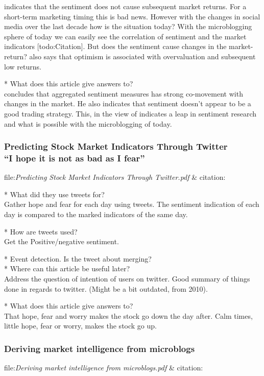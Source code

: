 \cite[p3]{Brown20041} indicates that the sentiment does not cause subsequent
market returns. For a short-term marketing timing this is bad news. However
with the changes in social media over the last decade how is the situation
today? With the microblogging sphere of today we can easily see the
correlation of sentiment and the market indicators [todo:Citation]. But
does the sentiment cause changes in the market-return? 
\cite[p3]{Brown20041} also says that optimism is associated with overvaluation and subsequent low returns.

* What does this article give answers to?\\
\cite[p]{Brown20041} concludes that aggregated sentiment measures has strong
co-movement with changes in the market. He also indicates that sentiment
doesn't appear to be a good trading strategy. This, in the view of
\cite[]{Zhang201155} indicates a leap in sentiment research and what is possible
with the microblogging of today. 

\subsubsection{Predicting Stock Market Indicators Through Twitter\\ “I hope it is not as bad as I fear”}
file:\textit{Predicting Stock Market Indicators Through Twitter.pdf} & citation:\cite[]{Zhang201155}

* What did they use tweets for?\\
Gather hope and fear for each day using tweets. 
The sentiment indication of each day is compared to the marked indicators of
the same day. 

* How are tweets used?\\
Get the Positive/negative sentiment. 

* Event detection. Is the tweet about merging? \\
* Where can this article be useful later? \\
Address the question of intention of users on twitter. 
Good summary of things done in regards to twitter. (Might be a bit outdated,
from 2010). 

* What does this article give answers to?\\
That hope, fear and worry makes the stock go down the day after. Calm times,
little hope, fear or worry, makes the stock go up. 


\subsubsection{Deriving market intelligence from microblogs}
file:\textit{Deriving market intelligence from microblogs.pdf} & citation:\cite[]{Li2013206}

